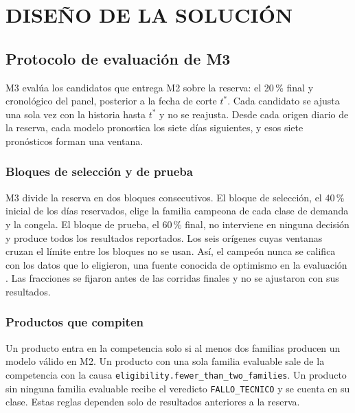 \setcounter{subsection}{0}
\section{DISEÑO DE LA SOLUCIÓN}

\subsection{Protocolo de evaluación de M3}
M3 evalúa los candidatos que entrega M2 sobre la reserva: el 20\,\% final y cronológico del panel, posterior a la fecha de corte $t^*$. Cada candidato se ajusta una sola vez con la historia hasta $t^*$ y no se reajusta. Desde cada origen diario de la reserva, cada modelo pronostica los siete días siguientes, y esos siete pronósticos forman una ventana.

\subsubsection{Bloques de selección y de prueba}
M3 divide la reserva en dos bloques consecutivos. El bloque de selección, el 40\,\% inicial de los días reservados, elige la familia campeona de cada clase de demanda y la congela. El bloque de prueba, el 60\,\% final, no interviene en ninguna decisión y produce todos los resultados reportados. Los seis orígenes cuyas ventanas cruzan el límite entre los bloques no se usan. Así, el campeón nunca se califica con los datos que lo eligieron, una fuente conocida de optimismo en la evaluación \cite{cawley2010}. Las fracciones se fijaron antes de las corridas finales y no se ajustaron con sus resultados.

\subsubsection{Productos que compiten}
\begin{sloppypar}
Un producto entra en la competencia solo si al menos dos familias producen un modelo válido en M2. Un producto con una sola familia evaluable sale de la competencia con la causa \texttt{eligibility.\allowbreak fewer\_than\_two\_families}. Un producto sin ninguna familia evaluable recibe el veredicto \texttt{FALLO\_TECNICO} y se cuenta en su clase. Estas reglas dependen solo de resultados anteriores a la reserva.
\end{sloppypar}

